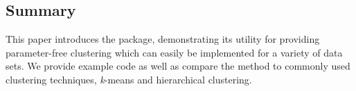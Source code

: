 \hypertarget{summary}{%
\subsection{Summary}\label{summary}}

This paper introduces the  package, demonstrating its
utility for providing parameter-free clustering which can easily be
implemented for a variety of data sets. We provide example code as well
as compare the method to commonly used clustering techniques,
\emph{k}-means and hierarchical clustering.




\address{%
Lucy D'Agostino McGowan\\
Wake Forest University\\%
Winston-Salem, NC\\ 27106\\
%
%
%
\href{mailto:mcgowald@wfu.edu}{\nolinkurl{mcgowald@wfu.edu}}%
}

\address{%
Katherine Moore\\
Wake Forest Unversity\\%
Winston-Salem, NC\\ 27106\\
%
%
%
\href{mailto:mooreke@wfu.edu}{\nolinkurl{mooreke@wfu.edu}}%
}

\address{%
Kenneth Berenhaut\\
Wake Forest University\\%
Winston-Salem, NC\\ 27106\\
%
%
%
\href{mailto:berenhks@wfu.edu}{\nolinkurl{berenhks@wfu.edu}}%
}
